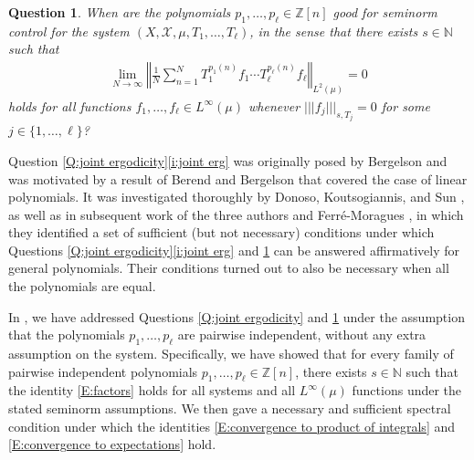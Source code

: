 \documentclass[11pt]{amsart}
\newtheorem{question}{Question}
\theoremstyle{definition}
\newcommand{\N}{{\mathbb N}}
\newcommand{\Z}{{\mathbb Z}}
\newcommand{\CX}{{\mathcal X}}
\newcommand{\CZ}{{\mathcal Z}}
\newcommand{\norm}[1]{\left\Vert #1\right\Vert}
\newcommand{\nnorm}[1]{\lvert\!|\!| #1|\!|\!\rvert}
\DeclareMathOperator*{\E}{\mathbb{E}}
\begin{document}
\begin{question}\label{Q:factors}
When are the polynomials $p_1, \ldots, p_\ell\in\Z[n]$ \emph{good for seminorm control} for the system $(X, \CX, \mu, T_1, \ldots, T_\ell)$, in the sense that there exists $s\in\N$ such that
\begin{align}\label{E:factors}
    \lim_{N\to\infty}\norm{\frac{1}{N}\sum_{n=1}^N T_1^{p_1(n)}f_1 \cdots T_\ell^{p_\ell(n)}f_\ell}_{L^2(\mu)} = 0
\end{align}
holds for all functions $f_1, \ldots, f_\ell\in L^\infty(\mu)$ whenever $\nnorm{f_j}_{s,T_j} = 0$ for some $j \in\{1, \ldots, \ell\}$?
\end{question}


Question \ref{Q:joint ergodicity}\eqref{i:joint erg} was originally posed by Bergelson and was motivated by
 a result of Berend and Bergelson \cite{BB84} that covered the case of linear polynomials.
It was investigated thoroughly by Donoso, Koutsogiannis, and Sun \cite{DKS19}, as well as in subsequent work of the three authors and Ferr\'e-Moragues \cite{DFMKS21},
  in which they identified a set of sufficient (but not necessary) conditions under which Questions \ref{Q:joint ergodicity}\eqref{i:joint erg} and \ref{Q:factors} can be answered affirmatively for general polynomials. Their conditions turned out to  also be necessary when all the polynomials are equal.

In \cite{FrKu22}, we have addressed Questions \ref{Q:joint ergodicity} and \ref{Q:factors} under the assumption that the polynomials $p_1, \ldots, p_\ell$ are pairwise independent, without any extra assumption on the system. Specifically, we have showed that for every family of pairwise independent polynomials $p_1, \ldots, p_\ell\in\Z[n]$,
there exists $s\in\N$ such that the identity \eqref{E:factors} holds for all systems and all $L^\infty(\mu)$ functions under the stated seminorm assumptions. We then gave a necessary and sufficient spectral condition under which the identities \eqref{E:convergence to product of integrals} and \eqref{E:convergence to expectations} hold.
\end{document}
